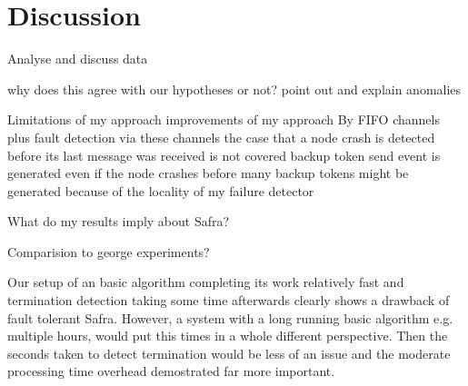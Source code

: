 \section{Discussion}

Analyse and discuss data

why does this agree with our hypotheses or not?
  point out and explain anomalies
  
Limitations of my approach
  improvements of my approach
  By FIFO channels plus fault detection via these channels the case that a node crash is detected before its last message was received is not covered
  backup token send event is generated even if the node crashes before
  many backup tokens might be generated because of the locality of my failure detector
  
What do my results imply about Safra?
  
  
  
Comparision to george experiments?

Our setup of an basic algorithm completing its work relatively fast and termination detection taking some time afterwards clearly shows a drawback of fault tolerant Safra.
However, a system with a long running basic algorithm e.g. multiple hours, would put this times in a whole different perspective.
Then the seconds taken to detect termination would be less of an issue and the moderate processing time overhead demostrated far more important.
